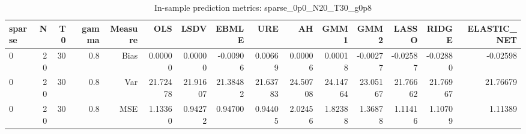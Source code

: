 \begin{table}[!htbp]\centering
\caption{In-sample prediction metrics: sparse_0p0_N20_T30_g0p8}
\label{tab:table2_sparse_0p0_N20_T30_g0p8}
\begin{tabular}{lrrrrrrrrrrrrrr}
\hline
sparse & N & T0 & gamma & Measure & OLS & LSDV & EBMLE & URE & AH & GMM1 & GMM2 & LASSO & RIDGE & ELASTIC_NET \\
\hline
0 & 20 & 30 & 0.8 & Bias & 0.00000 & 0.00000 & -0.00906 & 0.00669 & 0.00006 & 0.00018 & -0.00277 & -0.02587 & -0.02880 & -0.02598 \\
0 & 20 & 30 & 0.8 & Var & 21.72478 & 21.91607 & 21.38482 & 21.63783 & 24.50708 & 24.14764 & 23.05167 & 21.76662 & 21.76967 & 21.76679 \\
0 & 20 & 30 & 0.8 & MSE & 1.13360 & 0.94272 & 0.94700 & 0.94405 & 2.02456 & 1.82388 & 1.36878 & 1.11416 & 1.10709 & 1.11389 \\
\hline
\end{tabular}
\end{table}

